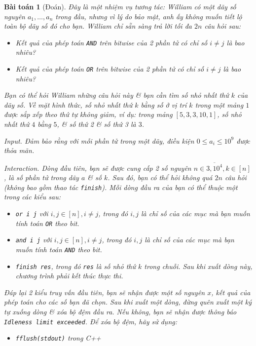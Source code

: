 \documentclass{article}
\newtheorem{baitoan}{Bài toán}
\begin{document}
\begin{baitoan}[Đoán]
    Đây là một nhiệm vụ tương tác: {\sc William} có một dãy số nguyên $a_1,\ldots,a_n$ trong đầu, nhưng vì lý do bảo mật, anh ấy không muốn tiết lộ toàn bộ dãy số đó cho bạn. {\sc William} chỉ sẵn sàng trả lời tối đa $2n$ câu hỏi sau:

    \begin{itemize}
        \item Kết quả của phép toán {\tt AND} trên bitwise của 2 phần tử có chỉ số $i\ne j$ là bao nhiêu?
        \item Kết quả của phép toán {\tt OR} trên bitwise của 2 phần tử có chỉ số $i\ne j$ là bao nhiêu?
    \end{itemize}
    Bạn có thể hỏi {\sc William} những câu hỏi này \& bạn cần tìm số nhỏ nhất thứ $k$ của dãy số. Về mặt hình thức, số nhỏ nhất thứ $k$ bằng số ở vị trí $k$ trong một mảng $1$ được sắp xếp theo thứ tự không giảm, ví dụ: trong mảng $[5,3,3,10,1]$, số nhỏ nhất thứ $4$ bằng $5$, \& số thứ 2 \& số thứ 3 là $3$.
    \item {\sf Input.} Đảm bảo rằng với mỗi phần tử trong một dãy, điều kiện $0\le a_i\le10^9$ được thỏa mãn.
    \item {\sf Interaction.} Dòng đầu tiên, bạn sẽ được cung cấp 2 số nguyên $n\in\overline{3,10^4},k\in[n]$, là số phần tử trong dãy $a$ \& số $k$. Sau đó, bạn có thể hỏi không quá $2n$ câu hỏi (không bao gồm thao tác {\tt finish}). Mỗi dòng đầu ra của bạn có thể thuộc một trong các kiểu sau:
    \begin{itemize}
        \item {\tt or i j} với $i,j\in[n],i\ne j$, trong đó $i,j$ là chỉ số của các mục mà bạn muốn tính toán {\tt OR} theo bit.
        \item {\tt and i j} với $i,j\in[n],i\ne j$, trong đó $i,j$ là chỉ số của các mục mà bạn muốn tính toán {\tt AND} theo bit.
        \item {\tt finish res}, trong đó {\tt res} là số nhỏ thứ $k$ trong chuỗi. Sau khi xuất dòng này, chương trình phải kết thúc thực thi.
    \end{itemize}
    Đáp lại 2 kiểu truy vấn đầu tiên, bạn sẽ nhận được một số nguyên $x$, kết quả của phép toán cho các số bạn đã chọn. Sau khi xuất một dòng, đừng quên xuất một ký tự xuống dòng \& xóa bộ đệm đầu ra. Nếu không, bạn sẽ nhận được thông báo {\tt Idleness limit exceeded}. Để xóa bộ đệm, hãy sử dụng:
    \begin{itemize}
        \item {\tt fflush(stdout)} trong C++

\end{itemize}
\end{baitoan}
\end{document}
